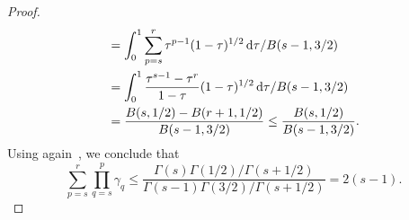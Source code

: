 \documentclass[../main]{subfiles}
\begin{document}
\begin{proof}
\begin{equation}
\begin{split}
            &= \int_{0}^{1} \sum_{p = s}^{r} \tau^{p - 1} (1 - \tau)^{1 / 2} \odif{\tau} / B(s - 1, 3 / 2) \\
            &= \int_{0}^{1} \frac{\tau^{s - 1} - \tau^r}{1 - \tau} (1 - \tau)^{1 / 2} \odif{\tau} / B(s - 1, 3 / 2) \\
            &= \frac{B(s, 1 / 2) - B(r + 1, 1 / 2)}{B(s - 1, 3 / 2)}
            \le \frac{B(s, 1 / 2)}{B(s - 1, 3 / 2)}
            .\end{split}
    \end{equation}
    Using again~, we conclude that
    \begin{equation}
        \sum_{p = s}^{r} \prod_{q = s}^{p} \gamma_q
        \le \frac{\Gamma(s) \Gamma(1 / 2) / \Gamma(s + 1 / 2)}{\Gamma(s - 1) \Gamma(3 / 2) / \Gamma(s + 1 / 2)}
        = 2 (s - 1)
        .\end{equation}
\end{proof}
\end{document}
